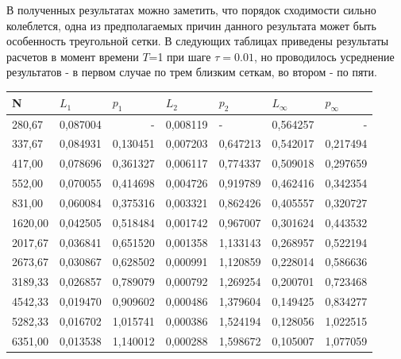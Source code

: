 \documentclass[14pt]{article}
\begin{document}
В полученных результатах можно заметить, что порядок сходимости сильно колеблется, одна из предполагаемых причин данного результата может быть особенность треугольной сетки. В следующих таблицах приведены результаты расчетов в момент времени $T$=1 при шаге $\tau=0.01$, но проводилось усреднение результатов - в первом случае по трем близким сеткам, во втором - по пяти.
\begin{table}[]
\begin{tabular}{|l|l|l|l|l|l|l|}
\hline
\multicolumn{1}{|l|}{N} & \multicolumn{1}{l|}{$L_1$}        & \multicolumn{1}{l|}{$p_1$} & \multicolumn{1}{l|}{$L_2$}     & \multicolumn{1}{l|}{$p_2$} & \multicolumn{1}{l|}{$L_\infty$} & \multicolumn{1}{l|}{$p_\infty$} \\ \hline
280,67   & 0,087004 & \multicolumn{1}{r|}{-} & 0,008119 & -        & 0,564257 & \multicolumn{1}{r|}{-} \\ \hline
337,67   & 0,084931 & 0,130451               & 0,007203 & 0,647213 & 0,542017 & 0,217494               \\ \hline
417,00   & 0,078696 & 0,361327               & 0,006117 & 0,774337 & 0,509018 & 0,297659               \\ \hline
552,00   & 0,070055 & 0,414698               & 0,004726 & 0,919789 & 0,462416 & 0,342354               \\ \hline
831,00   & 0,060084 & 0,375316               & 0,003321 & 0,862426 & 0,405557 & 0,320727               \\ \hline
1620,00  & 0,042505 & 0,518484               & 0,001742 & 0,967007 & 0,301624 & 0,443532               \\ \hline
2017,67  & 0,036841 & 0,651520               & 0,001358 & 1,133143 & 0,268957 & 0,522194               \\ \hline
2673,67  & 0,030867 & 0,628502               & 0,000991 & 1,120859 & 0,228014 & 0,586636               \\ \hline
3189,33  & 0,026857 & 0,789079               & 0,000792 & 1,269254 & 0,200701 & 0,723468               \\ \hline
4542,33  & 0,019470 & 0,909602               & 0,000486 & 1,379604 & 0,149425 & 0,834277               \\ \hline
5282,33  & 0,016702 & 1,015741               & 0,000386 & 1,524194 & 0,128056 & 1,022515               \\ \hline
6351,00  & 0,013538 & 1,140012               & 0,000288 & 1,598672 & 0,105007 & 1,077059               \\ \hline

\end{tabular}
\end{table}
\end{document}
